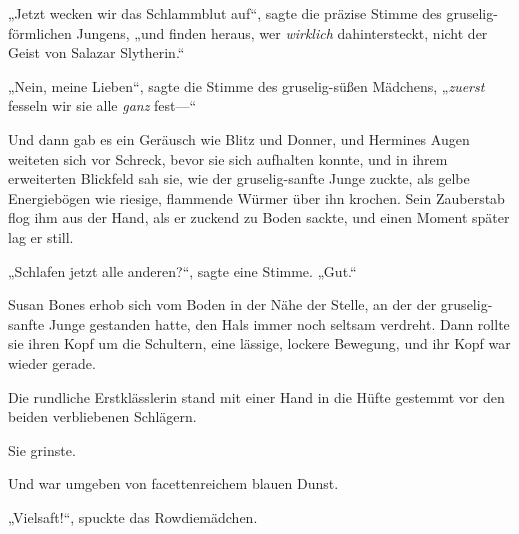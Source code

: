 „Jetzt wecken wir das Schlammblut auf“, sagte die präzise Stimme des gruselig-förmlichen Jungens, „und finden heraus, wer \emph{wirklich} dahintersteckt, nicht der Geist von Salazar Slytherin.“

„Nein, meine Lieben“, sagte die Stimme des gruselig-süßen Mädchens, „\emph{zuerst} fesseln wir sie alle \emph{ganz} fest—“

Und dann gab es ein Geräusch wie Blitz und Donner, und Hermines Augen weiteten sich vor Schreck, bevor sie sich aufhalten konnte, und in ihrem erweiterten Blickfeld sah sie, wie der gruselig-sanfte Junge zuckte, als gelbe Energiebögen wie riesige, flammende Würmer über ihn krochen. Sein Zauberstab flog ihm aus der Hand, als er zuckend zu Boden sackte, und einen Moment später lag er still.

„Schlafen jetzt alle anderen?“, sagte eine Stimme. „Gut.“

Susan Bones erhob sich vom Boden in der Nähe der Stelle, an der der gruselig-sanfte Junge gestanden hatte, den Hals immer noch seltsam verdreht. Dann rollte sie ihren Kopf um die Schultern, eine lässige, lockere Bewegung, und ihr Kopf war wieder gerade.

Die rundliche Erstklässlerin stand mit einer Hand in die Hüfte gestemmt vor den beiden verbliebenen Schlägern.

Sie grinste.

Und war umgeben von facettenreichem blauen Dunst.

„Vielsaft!“, spuckte das Rowdiemädchen.


